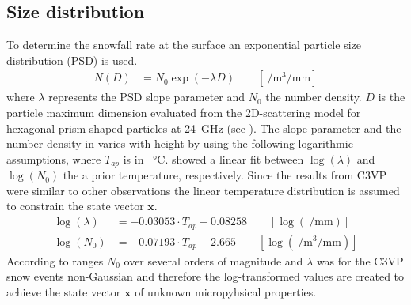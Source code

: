 \subsection{Size distribution} \label{sec:size_dist}
To determine the snowfall rate at the surface an exponential particle size distribution (PSD) is used. 
\begin{align}
N(D) & = N_{0} \exp\left(-\lambda D\right) \qquad [ \SI{}{\per\cubic\metre\per\mm} ] \label{eq:num_dens}
\end{align}
where $\lambda$ represents the PSD slope parameter and $N_{0}$ the number density. $D$ is the particle maximum dimension evaluated from the 2D-scattering model for hexagonal prism shaped particles at \SI{24}{\giga\Hz} (see ).
The slope parameter and the number density in  varies with height by using the following logarithmic assumptions, where $T_{ap}$ is in \SI{}{\celsius}. \cite{wood_estimation_2011} showed a linear fit between $\log(\lambda)$ and $\log(N_0)$ the a prior temperature, respectively. Since the results from C3VP were similar to other observations the linear temperature distribution is assumed to constrain the state vector $\mathbf{x}$.
\begin{align}
\log(\lambda) & = -0.03053 \cdot T_{ap} - 0.08258  \label{eq:lambda} \qquad [ \log(\SI{}{\per\mm}) ]\\
\log(N_0) & = -0.07193 \cdot T_{ap} +2.665  \qquad [ \log(\SI{}{\per\cubic\metre\per\mm})]
\label{eq:N0}
\end{align}
According to \cite{wood_level_2013} ranges $N_0$ over several orders of magnitude and $\lambda$ was for the C3VP \citep{hudak_canadian_2006} snow events non-Gaussian and therefore the log-transformed values are created to achieve the state vector $\mathbf{x}$ of unknown micropyhsical properties.
